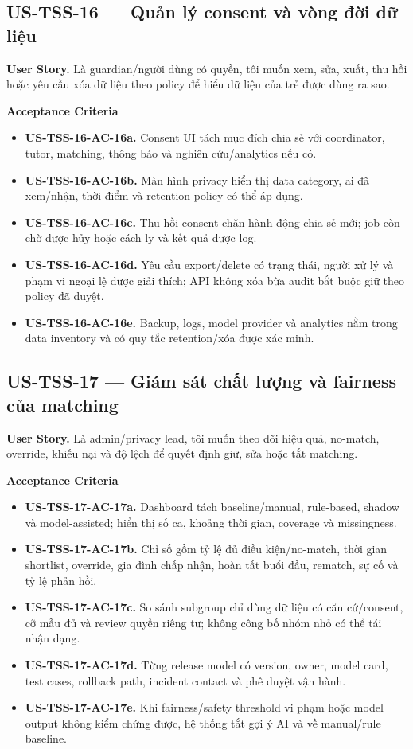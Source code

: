 \documentclass[11pt,a4paper]{article}
\newcommand{\ac}[1]{\textbf{\currentstory-AC-#1.}}
\newcommand{\storytitle}[2]{\subsection{#1 — #2}\def\currentstory{#1}}
\newcommand{\story}[1]{\textbf{User Story.} #1\par}
\newcommand{\acceptance}{\textbf{Acceptance Criteria}\par}
\begin{document}
\storytitle{US-TSS-16}{Quản lý consent và vòng đời dữ liệu}
\story{Là guardian/người dùng có quyền, tôi muốn xem, sửa, xuất, thu hồi hoặc yêu cầu xóa dữ liệu theo policy để hiểu dữ liệu của trẻ được dùng ra sao.}
\acceptance
\begin{itemize}
  \item \ac{16a} Consent UI tách mục đích chia sẻ với coordinator, tutor, matching, thông báo và nghiên cứu/analytics nếu có.
  \item \ac{16b} Màn hình privacy hiển thị data category, ai đã xem/nhận, thời điểm và retention policy có thể áp dụng.
  \item \ac{16c} Thu hồi consent chặn hành động chia sẻ mới; job còn chờ được hủy hoặc cách ly và kết quả được log.
  \item \ac{16d} Yêu cầu export/delete có trạng thái, người xử lý và phạm vi ngoại lệ được giải thích; API không xóa bừa audit bắt buộc giữ theo policy đã duyệt.
  \item \ac{16e} Backup, logs, model provider và analytics nằm trong data inventory và có quy tắc retention/xóa được xác minh.
\end{itemize}

\storytitle{US-TSS-17}{Giám sát chất lượng và fairness của matching}
\story{Là admin/privacy lead, tôi muốn theo dõi hiệu quả, no-match, override, khiếu nại và độ lệch để quyết định giữ, sửa hoặc tắt matching.}
\acceptance
\begin{itemize}
  \item \ac{17a} Dashboard tách baseline/manual, rule-based, shadow và model-assisted; hiển thị số ca, khoảng thời gian, coverage và missingness.
  \item \ac{17b} Chỉ số gồm tỷ lệ đủ điều kiện/no-match, thời gian shortlist, override, gia đình chấp nhận, hoàn tất buổi đầu, rematch, sự cố và tỷ lệ phản hồi.
  \item \ac{17c} So sánh subgroup chỉ dùng dữ liệu có căn cứ/consent, cỡ mẫu đủ và review quyền riêng tư; không công bố nhóm nhỏ có thể tái nhận dạng.
  \item \ac{17d} Từng release model có version, owner, model card, test cases, rollback path, incident contact và phê duyệt vận hành.
  \item \ac{17e} Khi fairness/safety threshold vi phạm hoặc model output không kiểm chứng được, hệ thống tắt gợi ý AI và về manual/rule baseline.
\end{itemize}
\end{document}

